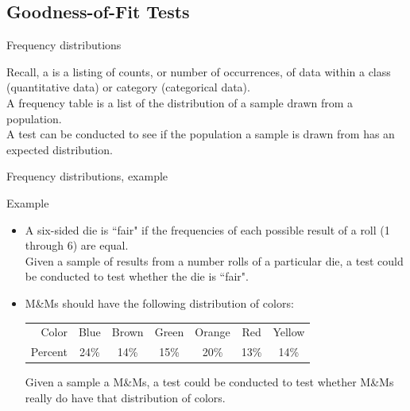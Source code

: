 \documentclass[xcolor=table, aspectratio=169, bigger]{beamer}
\begin{document}
%
%
\subsection{Goodness-of-Fit Tests}

\begin{frame}{Frequency distributions}
\begin{block}{}
Recall, a  is a listing of counts, or number of occurrences, of data within a class (quantitative data) or category (categorical data). \\
\pause\medskip
A frequency table is a list of the distribution of a sample drawn from a population.\\
\pause\medskip
A test can be conducted to see if the population a sample is drawn from has an expected distribution.
\end{block}
\end{frame}

\begin{frame}{Frequency distributions, example}
\begin{exampleblock}{Example}
\begin{itemize}
\item A six-sided die is ``fair" if the frequencies of each possible result of a roll (1 through 6) are equal.\\
\medskip
Given a sample of results from a number rolls of a particular die, a test could be conducted to test whether the die is ``fair".
\smallskip

\pause\item M\&Ms should have the following distribution of colors:\\
\smallskip
{\centering
\begin{tabular}{r | c c c c c c }
Color & Blue & Brown & Green & Orange & Red & Yellow\\
Percent & 24\% & 14\% & 15\% & 20\% & 13\% & 14\% 
\end{tabular}
\par} 
\bigskip
Given a sample a M\&Ms, a test could be conducted to test whether M\&Ms really do have that distribution of colors.
\end{itemize}
\end{exampleblock}
\end{frame}
\end{document}
